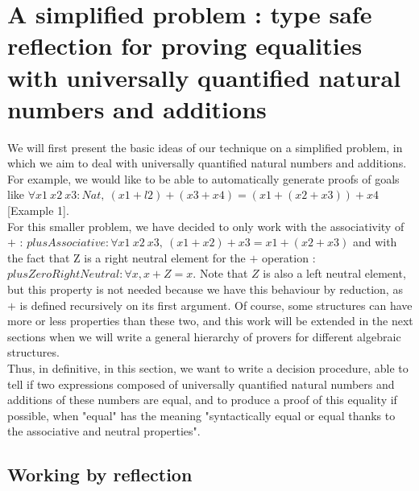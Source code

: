 \section{A simplified problem : type safe reflection for proving equalities with universally quantified natural numbers and additions}


We will first present the basic ideas of our technique on a simplified problem, in which we aim to deal with universally quantified natural numbers and additions.
For example, we would like to be able to automatically generate proofs of goals like $\forall x1\ x2\ x3:Nat,\ (x1 + l2) + (x3 + x4) = (x1 + (x2 + x3)) + x4$ [Example 1]. \\
For this smaller problem, we have decided to only work with the associativity of $+$ : $plusAssociative : \forall x1\ x2\ x3,\ (x1 + x2) + x3 = x1 + (x2 + x3)$ and with the fact that Z is a right neutral element for the $+$ operation : $plusZeroRightNeutral : \forall x, x + Z = x$. Note that $Z$ is also a left neutral element, but this property is not needed because we have this behaviour by reduction, as $+$ is defined recursively on its first argument. Of course, some structures can have more or less properties than these two, and this work will be extended in the next sections when we will write a general hierarchy of provers for different algebraic structures. \\
Thus, in definitive, in this section, we want to write a decision procedure, able to tell if two expressions composed of universally quantified natural numbers and additions of these numbers are equal, and to produce a proof of this equality if possible, when "equal" has the meaning "syntactically equal or equal thanks to the associative and neutral properties".


\subsection{Working by reflection}


